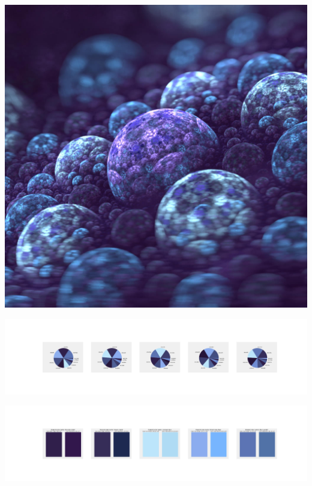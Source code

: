 \documentclass[11pt]{article}
\begin{document}
\begin{landscape}
    \begin{center}
    \includegraphics[width=\textwidth]{./nbimg/file (267).jpg}
    \end{center}

    \begin{center}
    \includegraphics[width=250mm]{./nbimg/pie-186.jpg}
    \end{center}

    \begin{center}
    \includegraphics[width=250mm]{./nbimg/peak-186.jpg}
    \end{center}
    


\end{landscape}
\end{document}
